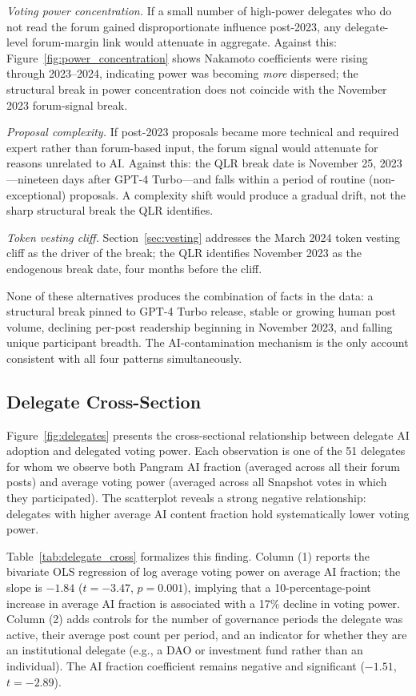 \documentclass[12pt]{article}
\newcommand{\FloatBarrier}{\par}
\begin{document}
\emph{Voting power concentration.} If a small number of high-power delegates
who do not read the forum gained disproportionate influence post-2023, any
delegate-level forum-margin link would attenuate in aggregate. Against this:
Figure~\ref{fig:power_concentration} shows Nakamoto coefficients were rising through
2023--2024, indicating power was becoming \emph{more} dispersed; the structural break
in power concentration does not coincide with the November 2023 forum-signal break.

\emph{Proposal complexity.} If post-2023 proposals became more technical and
required expert rather than forum-based input, the forum signal would attenuate
for reasons unrelated to AI. Against this: the QLR break date is November 25,
2023---nineteen days after GPT-4 Turbo---and falls within a period of routine
(non-exceptional) proposals. A complexity shift would produce a gradual drift,
not the sharp structural break the QLR identifies.

\emph{Token vesting cliff.} Section~\ref{sec:vesting} addresses the March 2024
token vesting cliff as the driver of the break; the QLR identifies November
2023 as the endogenous break date, four months before the cliff.

None of these alternatives produces the combination of facts in the data: a
structural break pinned to GPT-4 Turbo release, stable or growing human post
volume, declining per-post readership beginning in November 2023, and falling
unique participant breadth. The AI-contamination mechanism is the only account
consistent with all four patterns simultaneously.

\FloatBarrier
\subsection{Delegate Cross-Section}

Figure~\ref{fig:delegates} presents the cross-sectional relationship between
delegate AI adoption and delegated voting power. Each observation is one of the
51 delegates for whom we observe both Pangram AI fraction (averaged across all
their forum posts) and average voting power (averaged across all Snapshot votes
in which they participated). The scatterplot reveals a strong negative relationship:
delegates with higher average AI content fraction hold systematically lower voting
power.

Table~\ref{tab:delegate_cross} formalizes this finding. Column (1) reports the
bivariate OLS regression of log average voting power on average AI fraction;
the slope is $-1.84$ ($t = -3.47$, $p = 0.001$), implying that a 10-percentage-point
increase in average AI fraction is associated with a 17\% decline in voting power.
Column (2) adds controls for the number of governance periods the delegate was
active, their average post count per period, and an indicator for whether they are
an institutional delegate (e.g., a DAO or investment fund rather than an individual).
The AI fraction coefficient remains negative and significant ($-1.51$, $t = -2.89$).
\end{document}
